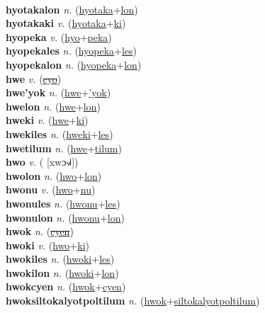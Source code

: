 \label{hyotaka} \\
\textbf{hyotakalon} \textit{n.} (\hyperref[hyotaka]{hyotaka}+\hyperref[lon]{lon})
 \label{hyotakalon} \\
\textbf{hyotakaki} \textit{v.} (\hyperref[hyotaka]{hyotaka}+\hyperref[ki]{ki})
 \label{hyotakaki} \\
\textbf{hyopeka} \textit{v.} (\hyperref[hyo]{hyo}+\hyperref[peka]{peka})
 \label{hyopeka} \\
\textbf{hyopekales} \textit{n.} (\hyperref[hyopeka]{hyopeka}+\hyperref[les]{les})
 \label{hyopekales} \\
\textbf{hyopekalon} \textit{n.} (\hyperref[hyopeka]{hyopeka}+\hyperref[lon]{lon})
 \label{hyopekalon} \\
\textbf{hwe} \textit{v.} (\hyperref[cyo]{\sout{cyo}})
 \label{hwe} \\
\textbf{hwe'yok} \textit{n.} (\hyperref[hwe]{hwe}+\hyperref['yok]{'yok})
 \label{hwe'yok} \\
\textbf{hwelon} \textit{n.} (\hyperref[hwe]{hwe}+\hyperref[lon]{lon})
 \label{hwelon} \\
\textbf{hweki} \textit{v.} (\hyperref[hwe]{hwe}+\hyperref[ki]{ki})
 \label{hweki} \\
\textbf{hwekiles} \textit{n.} (\hyperref[hweki]{hweki}+\hyperref[les]{les})
 \label{hwekiles} \\
\textbf{hwetilum} \textit{n.} (\hyperref[hwe]{hwe}+\hyperref[tilum]{tilum})
 \label{hwetilum} \\
\textbf{hwo} \textit{v.} ( [xwɔ˧˩˧])
 \label{hwo} \\
\textbf{hwolon} \textit{n.} (\hyperref[hwo]{hwo}+\hyperref[lon]{lon})
 \label{hwolon} \\
\textbf{hwonu} \textit{v.} (\hyperref[hwo]{hwo}+\hyperref[nu]{nu})
 \label{hwonu} \\
\textbf{hwonules} \textit{n.} (\hyperref[hwonu]{hwonu}+\hyperref[les]{les})
 \label{hwonules} \\
\textbf{hwonulon} \textit{n.} (\hyperref[hwonu]{hwonu}+\hyperref[lon]{lon})
 \label{hwonulon} \\
\textbf{hwok} \textit{n.} (\hyperref[cyen]{\sout{cyen}})
 \label{hwok} \\
\textbf{hwoki} \textit{v.} (\hyperref[hwo]{hwo}+\hyperref[ki]{ki})
 \label{hwoki} \\
\textbf{hwokiles} \textit{n.} (\hyperref[hwoki]{hwoki}+\hyperref[les]{les})
 \label{hwokiles} \\
\textbf{hwokilon} \textit{n.} (\hyperref[hwoki]{hwoki}+\hyperref[lon]{lon})
 \label{hwokilon} \\
\textbf{hwokcyen} \textit{n.} (\hyperref[hwok]{hwok}+\hyperref[cyen]{cyen})
 \label{hwokcyen} \\
\textbf{hwoksiltokalyotpoltilum} \textit{n.} (\hyperref[hwok]{hwok}+\hyperref[siltokalyotpoltilum]{siltokalyotpoltilum})
 \label{hwoksiltokalyotpoltilum} 

